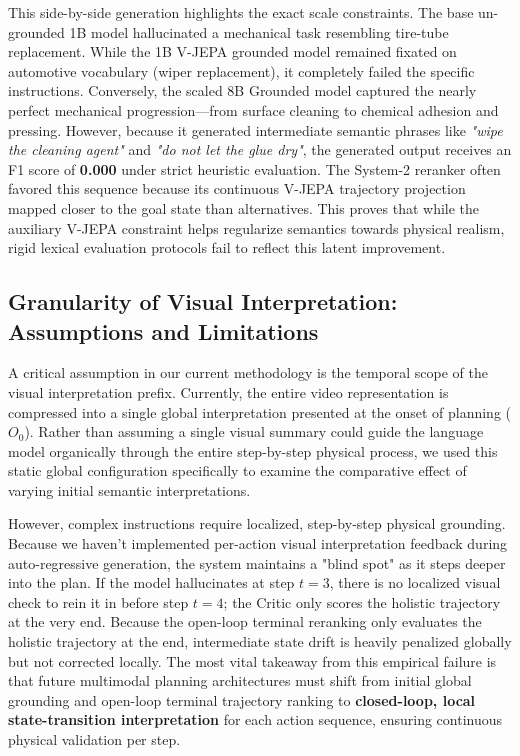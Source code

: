 \documentclass{article}
\begin{document}
This side-by-side generation highlights the exact scale constraints. The base un-grounded 1B model hallucinated a mechanical task resembling tire-tube replacement. While the 1B V-JEPA grounded model remained fixated on automotive vocabulary (wiper replacement), it completely failed the specific instructions. Conversely, the scaled 8B Grounded model captured the nearly perfect mechanical progression---from surface cleaning to chemical adhesion and pressing. However, because it generated intermediate semantic phrases like \textit{"wipe the cleaning agent"} and \textit{"do not let the glue dry"}, the generated output receives an F1 score of \textbf{0.000} under strict heuristic evaluation. The System-2 reranker often favored this sequence because its continuous V-JEPA trajectory projection mapped closer to the goal state than alternatives. This proves that while the auxiliary V-JEPA constraint helps regularize semantics towards physical realism, rigid lexical evaluation protocols fail to reflect this latent improvement.

\subsection{Granularity of Visual Interpretation: Assumptions and Limitations}
A critical assumption in our current methodology is the temporal scope of the visual interpretation prefix. Currently, the entire video representation is compressed into a single global interpretation presented at the onset of planning ($O_0$). Rather than assuming a single visual summary could guide the language model organically through the entire step-by-step physical process, we used this static global configuration specifically to examine the comparative effect of varying initial semantic interpretations.

However, complex instructions require localized, step-by-step physical grounding. Because we haven't implemented per-action visual interpretation feedback during auto-regressive generation, the system maintains a "blind spot" as it steps deeper into the plan. If the model hallucinates at step $t=3$, there is no localized visual check to rein it in before step $t=4$; the Critic only scores the holistic trajectory at the very end. Because the open-loop terminal reranking only evaluates the holistic trajectory at the end, intermediate state drift is heavily penalized globally but not corrected locally. The most vital takeaway from this empirical failure is that future multimodal planning architectures must shift from initial global grounding and open-loop terminal trajectory ranking to \textbf{closed-loop, local state-transition interpretation} for each action sequence, ensuring continuous physical validation per step.
\end{document}
